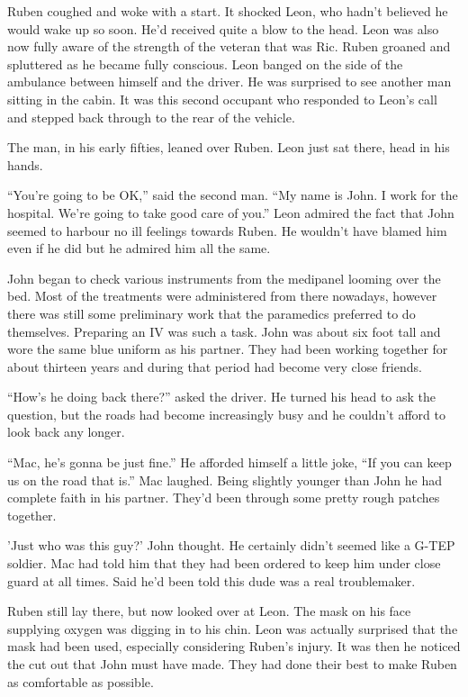\thoughtbreak



Ruben coughed and woke with a start.  It shocked Leon, who hadn't believed he would wake up so soon.  He'd received quite a blow to the head.  Leon was also now fully aware of the strength of the veteran that was Ric.  Ruben groaned and spluttered as he became fully conscious.  Leon banged on the side of the ambulance between himself and the driver.  He was surprised to see another man sitting in the cabin.  It was this second occupant who responded to Leon's call and stepped back through to the rear of the vehicle.  

The man, in his early fifties, leaned over Ruben.  Leon just sat there, head in his hands.  

``You're going to be OK,'' said the second man.  ``My name is John.  I work for the hospital.  We're going to take good care of you.''  Leon admired the fact that John seemed to harbour no ill feelings towards Ruben.  He wouldn't have blamed him even if he did but he admired him all the same.  

John began to check various instruments from the medipanel looming over the bed.  Most of the treatments were administered from there nowadays, however there was still some preliminary work that the paramedics preferred to do themselves.  Preparing an IV was such a task.  John was about six foot tall and wore the same blue uniform as his partner.  They had been working together for about thirteen years and during that period had become very close friends.  

``How's he doing back there?'' asked the driver.  He turned his head to ask the question, but the roads had become increasingly busy and he couldn't afford to look back any longer.

``Mac, he's gonna be just fine.'' He afforded himself a little joke, ``If you can keep us on the road that is.''  Mac laughed.  Being slightly younger than John he had complete faith in his partner.  They'd been through some pretty rough patches together.  

'Just who was this guy?' John thought.  He certainly didn't seemed like a G-TEP soldier.  Mac had told him that they had been ordered to keep him under close guard at all times.  Said he'd been told this dude was a real troublemaker.

Ruben still lay there, but now looked over at Leon.  The mask on his face supplying oxygen was digging in to his chin.  Leon was actually surprised that the mask had been used, especially considering Ruben's injury.  It was then he noticed the cut out that John must have made.  They had done their best to make Ruben as comfortable as possible.  

